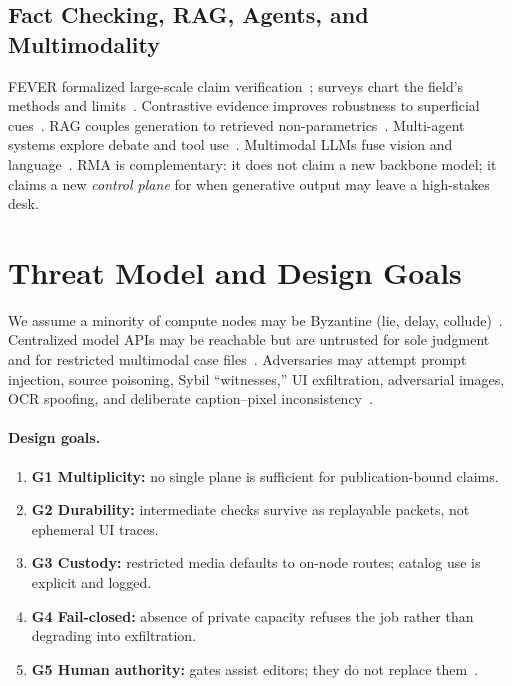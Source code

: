 \documentclass[journal,10pt,twocolumn,a4paper]{IEEEtran}
\begin{document}
\subsection{Fact Checking, RAG, Agents, and Multimodality}
FEVER formalized large-scale claim verification~\cite{thorne2018fever}; surveys chart the field's methods and limits~\cite{guo2022survey}.
Contrastive evidence improves robustness to superficial cues~\cite{schuster2021get}.
RAG couples generation to retrieved non-parametrics~\cite{lewis2020rag}.
Multi-agent systems explore debate and tool use~\cite{chen2023agents,wei2022chain}.
Multimodal LLMs fuse vision and language~\cite{radford2021clip,karanasou2024multimodal,openai2023gpt4}.
RMA is complementary: it does not claim a new backbone model; it claims a new \emph{control plane} for when generative output may leave a high-stakes desk.

\section{Threat Model and Design Goals}
\label{sec:threat}

We assume a minority of compute nodes may be Byzantine (lie, delay, collude)~\cite{lamport1982byzantine}.
Centralized model APIs may be reachable but are untrusted for sole judgment and for restricted multimodal case files~\cite{bender2021stochastic,bommasani2021foundation}.
Adversaries may attempt prompt injection, source poisoning, Sybil ``witnesses,'' UI exfiltration, adversarial images, OCR spoofing, and deliberate caption--pixel inconsistency~\cite{karanasou2024multimodal}.

\paragraph{Design goals.}
\begin{enumerate}
  \item \textbf{G1 Multiplicity:} no single plane is sufficient for publication-bound claims.
  \item \textbf{G2 Durability:} intermediate checks survive as replayable packets, not ephemeral UI traces.
  \item \textbf{G3 Custody:} restricted media defaults to on-node routes; catalog use is explicit and logged.
  \item \textbf{G4 Fail-closed:} absence of private capacity refuses the job rather than degrading into exfiltration.
  \item \textbf{G5 Human authority:} gates assist editors; they do not replace them~\cite{graves2017fact,silverman2015verification}.
\end{enumerate}
\end{document}

